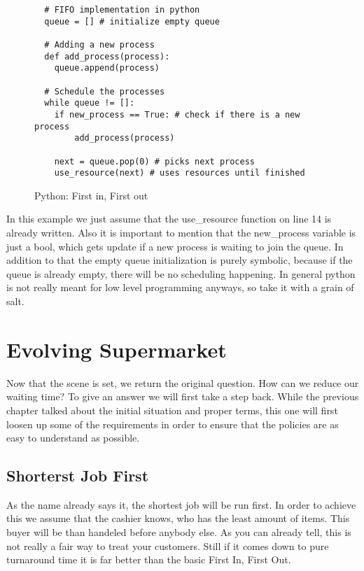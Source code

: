 \begin{figure}[h]
\begin{verbatim}
  # FIFO implementation in python
  queue = [] # initialize empty queue

  # Adding a new process
  def add_process(process):
    queue.append(process)

  # Schedule the processes
  while queue != []:
    if new_process == True: # check if there is a new process
        add_process(process)
    
    next = queue.pop(0) # picks next process
    use_resource(next) # uses resources until finished
\end{verbatim}
\caption{Python: First in, First out}
\label{code:fifo}
\end{figure}
In this example we just assume that the use\_resource function on line 14 is already written.
Also it is important to mention that the new\_process variable is just a bool, which gets update if a new process is waiting to join the queue.
In addition to that the empty queue initialization is purely symbolic, because if the queue is already empty, there will be no scheduling happening. 
In general python is not really meant for low level programming anyways, so take it with a grain of salt.


\chapter{Evolving Supermarket}

Now that the scene is set, we return the original question. 
How can we reduce our waiting time?
To give an answer we will first take a step back.
While the previous chapter talked about the initial situation and proper terms, this one will first loosen up some of the requirements in order to ensure that the policies are as easy to understand as possible.

\section{Shorterst Job First}

As the name already says it, the shortest job will be run first.
In order to achieve this we assume that the cashier knows, who has the least amount of items.
This buyer will be than handeled before anybody else. As you can already tell, this is not really a fair way to treat your customers.
Still if it comes down to pure turnaround time it is far better than the basic First In, First Out.

